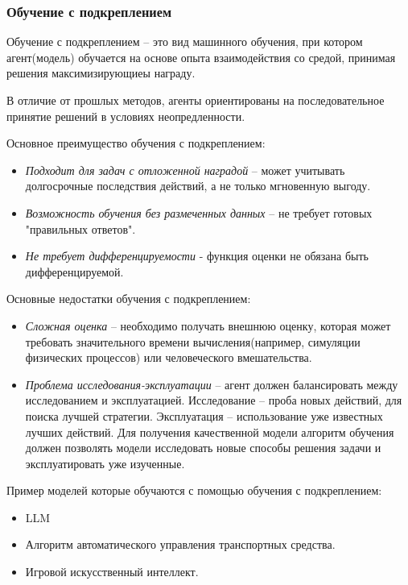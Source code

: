 \documentclass[../part_1.tex]{subfiles}
\begin{document}
\subsubsection{Обучение с подкреплением}
    \label{sec:reinforcement_learning}
    \par Обучение с подкреплением --  это вид машинного обучения, при котором агент(модель) обучается на основе опыта взаимодействия со средой, принимая решения максимизирующиеы награду.
    \par В отличие от прошлых методов, агенты ориентированы на последовательное принятие решений в условиях неопредленности.
    
    \par Основное преимущество обучения с подкреплением:
    \begin{itemize}
        \item \textit{Подходит для задач с отложенной наградой} -- может учитывать долгосрочные последствия действий, а не только мгновенную выгоду.
        \item \textit{Возможность обучения без размеченных данных} -- не требует готовых "правильных ответов".
        \item \textit{Не требует дифференцируемости} - функция оценки не обязана быть дифференцируемой.
    \end{itemize}
    \par Основные недостатки обучения с подкреплением:
    \begin{itemize}
        \item \textit{Сложная оценка} -- необходимо получать внешнюю оценку, которая может требовать значительного времени вычисления(например, симуляции физических процессов) или человеческого вмешательства.
        \item \textit{Проблема исследования-эксплуатации} -- агент должен балансировать между исследованием и эксплуатацией. Исследование -- проба новых действий, для поиска лучшей стратегии. Эксплуатация -- использование уже известных лучших действий. Для получения качественной модели алгоритм обучения должен позволять модели исследовать новые способы решения задачи и эксплуатировать уже изученные.
    \end{itemize}
    \par Пример моделей которые обучаются с помощью обучения с подкреплением:
    \begin{itemize}
        \item LLM\cite{llm}
        \item Алгоритм автоматического управления транспортных средства.
        \item Игровой искусственный интеллект.
    \end{itemize}
\end{document}

